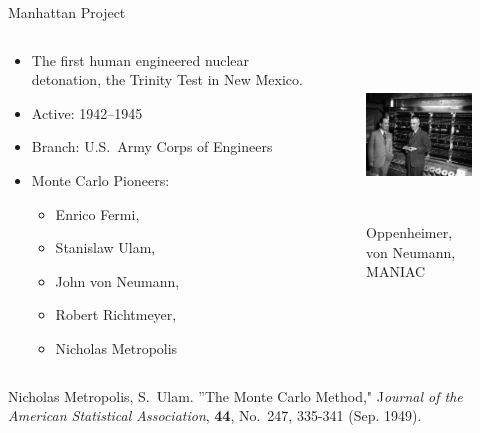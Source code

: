 \documentclass[xcolor=x11names,compress, handout]{beamer}
\renewcommand{\(}{\begin{columns}}
\renewcommand{\)}{\end{columns}}
\newcommand{\<}[1]{\begin{column}{#1}}
\renewcommand{\>}{\end{column}}
\begin{document}
\begin{frame}{Manhattan Project}

\begin{columns}
  \begin{column}{0.5\textwidth}
    \begin{itemize}
    \item The first human engineered nuclear detonation, 
    the Trinity Test in New Mexico.
    \item Active: 1942--1945
    \item Branch: U.S.\ Army Corps of Engineers
    \item Monte Carlo Pioneers:
    \begin{itemize}
      \item Enrico Fermi,
      \item Stanislaw Ulam,
      \item John von Neumann, 
      \item Robert Richtmeyer, 
      \item Nicholas Metropolis
    \end{itemize}
    \end{itemize}
  \end{column}
  \begin{column}{0.5\textwidth}
  	\begin{figure}
  	\begin{center}
  		\includegraphics[height=1.75in,clip]{OppieNeumannMANIAC}
  		\caption{Oppenheimer, von Neumann, MANIAC}
	\end{center}
  	\end{figure}
  \end{column}
\end{columns}
\pause
Nicholas Metropolis, S.\ Ulam. ''The Monte Carlo Method," J\textit{ournal of the American Statistical Association}, \textbf{44}, No.\ 247, 335-341 (Sep. 1949).
\end{frame}
\end{document}
